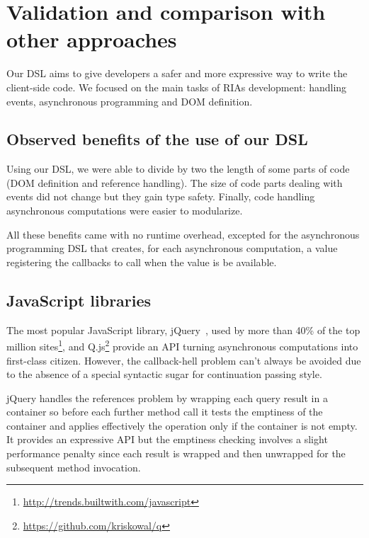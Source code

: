 \documentclass[american,english,runningheads]{llncs}
\begin{document}
\section{Validation and comparison with other approaches}
\label{validation}

Our DSL aims to give developers a safer and more expressive way to write the client-side code. We focused on the main
tasks of RIAs development: handling events, asynchronous programming and DOM definition.

\subsection{Observed benefits of the use of our DSL}

Using our DSL, we were able to divide by two the length of some parts of code (DOM definition and 
reference handling). The size of code parts dealing with events did not change but they gain type safety. Finally,
code handling asynchronous computations were easier to modularize.

All these benefits came with no runtime overhead, excepted for the asynchronous programming DSL that creates, for
each asynchronous computation, a  value registering the callbacks to call when the value is be
available.

\subsection{JavaScript libraries}

The most popular JavaScript library, jQuery~\cite{Bibeault08_jQuery}, used by more than 40\% of the top million
sites\footnote{\href{http://trends.builtwith.com/javascript}{http://trends.builtwith.com/javascript}}, and
Q.js\footnote{\href{https://github.com/kriskowal/q}{https://github.com/kriskowal/q}} provide an API turning
asynchronous computations into first-class citizen. However, the callback-hell problem can’t always be avoided due to
the absence of a special syntactic sugar for continuation passing style.

jQuery handles the  references problem by wrapping each query result in a container so before each further
method call it tests the emptiness of the container and applies effectively the operation only if the container is
not empty. It provides an expressive API but the emptiness checking involves a slight performance penalty since each
result is wrapped and then unwrapped for the subsequent method invocation.
\end{document}
